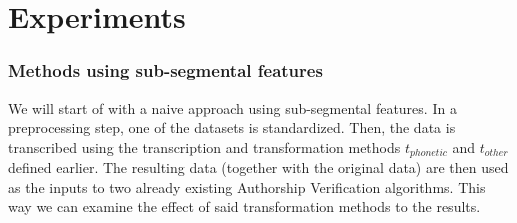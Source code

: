 \chapter{Experiments}\label{experiments}
\subsection{Methods using sub-segmental features}
We will start of with a naive approach using sub-segmental features. In a preprocessing step, one of the datasets is standardized. Then, the data is transcribed using the transcription and transformation methods $t_{phonetic}$ and $t_{other}$ defined earlier. The resulting data (together with the original data) are then used as the inputs to two already existing Authorship Verification algorithms. This way we can examine the effect of said transformation methods to the results.

